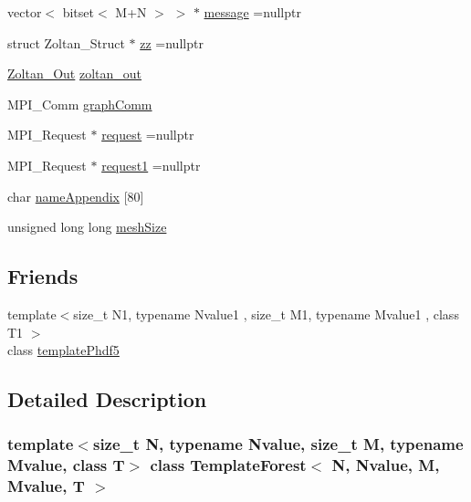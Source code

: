\begin{DoxyCompactItemize}
vector$<$ bitset$<$ M+N $>$ $>$ $\ast$ \mbox{\hyperlink{classTemplateForest_a5ecc1b5d7c94ff6c9164a2c63bfa6101}{message}} =nullptr
\item 
struct Zoltan\+\_\+\+Struct $\ast$ \mbox{\hyperlink{classTemplateForest_ad2dcf7d131f6fa9c68e3dba5229b85d6}{zz}} =nullptr
\item 
\mbox{\hyperlink{structZoltan__Out}{Zoltan\+\_\+\+Out}} \mbox{\hyperlink{classTemplateForest_a81d2200ebbc1e3a2ae557e6b6db3c442}{zoltan\+\_\+out}}
\item 
M\+P\+I\+\_\+\+Comm \mbox{\hyperlink{classTemplateForest_a55864067b34cf9807be0f42abb211b68}{graph\+Comm}}
\item 
M\+P\+I\+\_\+\+Request $\ast$ \mbox{\hyperlink{classTemplateForest_a0c51898863ad5472a890988d5645e2af}{request}} =nullptr
\item 
M\+P\+I\+\_\+\+Request $\ast$ \mbox{\hyperlink{classTemplateForest_a657e34ecc155063ccced9ca4ef3ef47e}{request1}} =nullptr
\item 
char \mbox{\hyperlink{classTemplateForest_a30c73b4c9e35b167e920dfe00af66b15}{name\+Appendix}} \mbox{[}80\mbox{]}
\item 
unsigned long long \mbox{\hyperlink{classTemplateForest_a421f9554610485547148a476d2e67147}{mesh\+Size}}
\end{DoxyCompactItemize}
\subsection*{Friends}
\begin{DoxyCompactItemize}
\item 
{\footnotesize template$<$size\+\_\+t N1, typename Nvalue1 , size\+\_\+t M1, typename Mvalue1 , class T1 $>$ }\\class \mbox{\hyperlink{classTemplateForest_a53f8d71ce667f14931aef7832c1b6c95}{template\+Phdf5}}
\end{DoxyCompactItemize}


\subsection{Detailed Description}
\subsubsection*{template$<$size\+\_\+t N, typename Nvalue, size\+\_\+t M, typename Mvalue, class T$>$\newline
class Template\+Forest$<$ N, Nvalue, M, Mvalue, T $>$}

